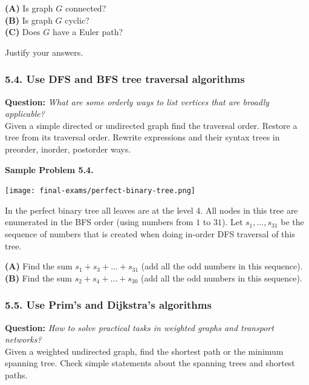 \documentclass[jou]{apa6}
\begin{document}
{\bf (A)} Is graph $G$ connected?\\
{\bf (B)} Is graph $G$ cyclic?\\
{\bf (C)} Does $G$ have a Euler path?

Justify your answers.



\subsubsection{5.4. Use DFS and BFS tree traversal algorithms} 

{\bf Question:} {\em What are some orderly ways to list vertices that are broadly applicable?}\\
{\scriptsize 
Given a simple directed or undirected graph find the traversal order. 
Restore a tree from its traversal order. Rewrite expressions and their syntax trees in preorder, inorder, postorder ways.
}



\vspace{6pt}
{\bf Sample Problem 5.4.}\\

\begin{center}
\texttt{[image: final-exams/perfect-binary-tree.png]}
\end{center}

In the perfect binary tree all leaves are at the level $4$. 
All nodes in this tree are enumerated in the BFS order (using numbers from $1$ to $31$). 
Let $s_1,\ldots,s_{31}$ be the sequence of numbers that is created when doing in-order DFS traversal of this tree. 

{\bf (A)} Find the sum $s_1 + s_3 + \ldots + s_{31}$ (add all the odd numbers in this sequence).\\
{\bf (B)} Find the sum $s_2 + s_4 + \ldots + s_{30}$ (add all the odd numbers in this sequence).\\


\subsubsection{5.5. Use Prim's and Dijkstra's algorithms}

{\bf Question:} {\em How to solve practical tasks in weighted graphs and transport networks?}\\
{\scriptsize 
Given a weighted undirected graph, find the shortest path or the minimum spanning tree. 
Check simple statements about the spanning trees and shortest paths. 
}
\end{document}
